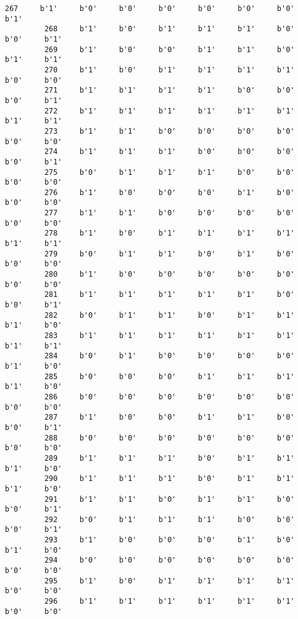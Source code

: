 \documentclass[11pt]{article}
\begin{document}
\begin{Verbatim}[commandchars=\\\{\}]
         267     b'1'     b'0'     b'0'     b'0'     b'0'     b'0'     b'0'     b'1'   
         268     b'1'     b'0'     b'1'     b'1'     b'1'     b'0'     b'0'     b'1'   
         269     b'1'     b'0'     b'0'     b'1'     b'1'     b'0'     b'1'     b'1'   
         270     b'1'     b'0'     b'1'     b'1'     b'1'     b'1'     b'0'     b'0'   
         271     b'1'     b'1'     b'1'     b'1'     b'0'     b'0'     b'0'     b'1'   
         272     b'1'     b'1'     b'1'     b'1'     b'1'     b'1'     b'1'     b'1'   
         273     b'1'     b'1'     b'0'     b'0'     b'0'     b'0'     b'0'     b'0'   
         274     b'1'     b'1'     b'1'     b'0'     b'0'     b'0'     b'0'     b'1'   
         275     b'0'     b'1'     b'1'     b'1'     b'0'     b'0'     b'0'     b'0'   
         276     b'1'     b'0'     b'0'     b'0'     b'1'     b'0'     b'0'     b'0'   
         277     b'1'     b'1'     b'0'     b'0'     b'0'     b'0'     b'0'     b'0'   
         278     b'1'     b'0'     b'1'     b'1'     b'1'     b'1'     b'1'     b'1'   
         279     b'0'     b'1'     b'1'     b'0'     b'1'     b'0'     b'0'     b'0'   
         280     b'1'     b'0'     b'0'     b'0'     b'0'     b'0'     b'0'     b'0'   
         281     b'1'     b'1'     b'1'     b'1'     b'1'     b'0'     b'0'     b'1'   
         282     b'0'     b'1'     b'1'     b'0'     b'1'     b'1'     b'1'     b'0'   
         283     b'1'     b'1'     b'1'     b'1'     b'1'     b'1'     b'1'     b'1'   
         284     b'0'     b'1'     b'0'     b'0'     b'0'     b'0'     b'1'     b'0'   
         285     b'0'     b'0'     b'0'     b'1'     b'1'     b'1'     b'1'     b'0'   
         286     b'0'     b'0'     b'0'     b'0'     b'0'     b'0'     b'0'     b'0'   
         287     b'1'     b'0'     b'0'     b'1'     b'1'     b'0'     b'0'     b'1'   
         288     b'0'     b'0'     b'0'     b'0'     b'0'     b'0'     b'0'     b'0'   
         289     b'1'     b'1'     b'1'     b'0'     b'1'     b'1'     b'1'     b'0'   
         290     b'1'     b'1'     b'1'     b'0'     b'1'     b'1'     b'1'     b'0'   
         291     b'1'     b'1'     b'0'     b'1'     b'1'     b'0'     b'0'     b'1'   
         292     b'0'     b'1'     b'1'     b'1'     b'0'     b'0'     b'0'     b'1'   
         293     b'1'     b'0'     b'0'     b'0'     b'1'     b'0'     b'1'     b'0'   
         294     b'0'     b'0'     b'0'     b'0'     b'0'     b'0'     b'0'     b'0'   
         295     b'1'     b'0'     b'1'     b'1'     b'1'     b'1'     b'0'     b'0'   
         296     b'1'     b'1'     b'1'     b'1'     b'1'     b'1'     b'0'     b'0'   

\end{Verbatim}
\end{document}

